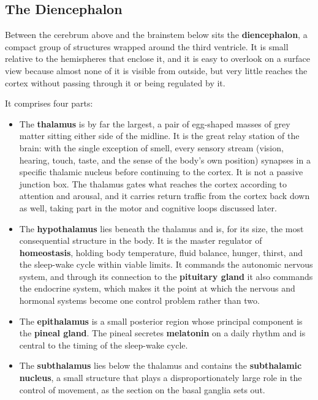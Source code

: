 \documentclass[11pt]{article}
\begin{document}
\subsection{The Diencephalon}

Between the cerebrum above and the brainstem below sits the \textbf{diencephalon}, a compact group of structures wrapped around the third ventricle. It is small relative to the hemispheres that enclose it, and it is easy to overlook on a surface view because almost none of it is visible from outside, but very little reaches the cortex without passing through it or being regulated by it.

It comprises four parts:

\begin{itemize}
    \item The \textbf{thalamus} is by far the largest, a pair of egg-shaped masses of grey matter sitting either side of the midline. It is the great relay station of the brain: with the single exception of smell, every sensory stream (vision, hearing, touch, taste, and the sense of the body's own position) synapses in a specific thalamic nucleus before continuing to the cortex. It is not a passive junction box. The thalamus gates what reaches the cortex according to attention and arousal, and it carries return traffic from the cortex back down as well, taking part in the motor and cognitive loops discussed later.
    \item The \textbf{hypothalamus} lies beneath the thalamus and is, for its size, the most consequential structure in the body. It is the master regulator of \textbf{homeostasis}, holding body temperature, fluid balance, hunger, thirst, and the sleep-wake cycle within viable limits. It commands the autonomic nervous system, and through its connection to the \textbf{pituitary gland} it also commands the endocrine system, which makes it the point at which the nervous and hormonal systems become one control problem rather than two.
    \item The \textbf{epithalamus} is a small posterior region whose principal component is the \textbf{pineal gland}. The pineal secretes \textbf{melatonin} on a daily rhythm and is central to the timing of the sleep-wake cycle.
    \item The \textbf{subthalamus} lies below the thalamus and contains the \textbf{subthalamic nucleus}, a small structure that plays a disproportionately large role in the control of movement, as the section on the basal ganglia sets out.
\end{itemize}
\end{document}
